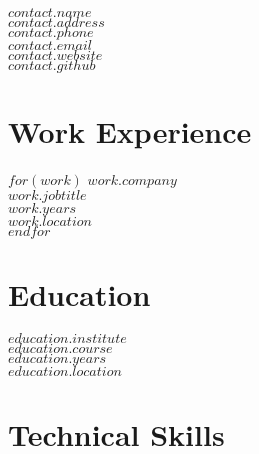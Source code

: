 \documentclass{article}
\begin{document}
$contact.name$\\
$contact.address$\\
$contact.phone$\\
$contact.email$\\
$contact.website$\\
$contact.github$

\section*{Work Experience}
$for(work)$
$work.company$\\
$work.jobtitle$\\
$work.years$\\
$work.location$\\
$endfor$

\section*{Education}
$education.institute$\\
$education.course$\\
$education.years$\\
$education.location$

\section*{Technical Skills}
\end{document}
